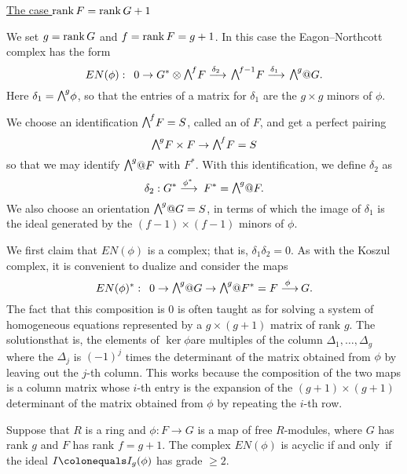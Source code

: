 \smallbreak
\noindent
\underline{The case $\operatorname{rank} F=\operatorname{rank} G + 1$}
\smallbreak

We set $g=\operatorname{rank} G$ and $f = \operatorname{rank} F = g+1$. In this case the
Eagon--Northcott complex has the form
$$
EN(\phi):\quad 0\to G^{*}\otimes \mwedge^{f}F \ruto {\delta_{2}}
\mwedge^{f-1}F \ruto {\delta_{1}} \mwedge^g@G.
$$
Here $\delta_{1} = \mwedge^{g}\phi$, so that the entries of a matrix for
$\delta_{1}$ are the $g\times g$ minors of
$\phi$.

We choose an identification $\mwedge^{f}F = S$, called an
%
of $F$, and get a perfect pairing
$$
\mwedge^{g}F \times F \to \mwedge^{f}F = S
$$
so that we may identify
$\mwedge^{g}@F$ with $F^{*}$. With this identification, we define
$\delta_{2}$ as
$$
\delta_{2}:  G^{*}\ruto {\phi^{*}}  F^{*} = \mwedge^{g}@F.
$$
We also choose an orientation $\mwedge^{g}@G = S$, in terms of which the
image of $\delta_{1}$ is
the ideal generated by the $(f{-}1)\times (f{-}1)$  minors of $\phi$.

We first claim that $EN(\phi)$ is a complex; that is,
$\delta_{1}\delta_{2} = 0$.  As with the Koszul complex,
%
it is convenient to dualize and consider the maps
$$
EN(\phi)^{*}:\quad 0\to \mwedge^{g} @
G \to \mwedge^{g}@F^{*} = F\ruto{\,\phi} G
.
$$
The fact that this composition is 0 is often taught as 
%
for solving a system of
homogeneous equations represented by a $g\times (g+1)$ matrix of rank $g$.
The solutions\emdash that is, the elements of $\ker \phi$\emdash are
multiples of the column
$\Delta_{1}, \dots, \Delta_{g}$ where the $\Delta_{j}$ is 
$(-1)^{j}$
times the determinant
of the matrix obtained from $\phi$ by leaving out the $j$-th column. This
works
because the composition of the two maps is a column matrix whose $i$-th
entry is the
expansion of the $(g+1)\times (g+1)$ determinant of the matrix obtained
from $\phi$ by
repeating the $i$-th row.

\begin{theorem}\label{EN grade 2}
Suppose that $R$ is a ring and $\phi: F\to G$ is a map of  free
$R$-modules,
where $G$ has rank $g$ and $F$ has rank $f = g+1$.
The complex $EN(\phi)$ is acyclic if and only~if the ideal $I
\colonequals  I_{g}(\phi)$ has grade $\geq 2$.
\end{theorem}

